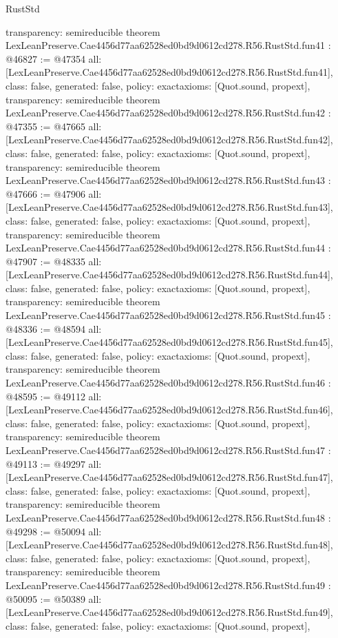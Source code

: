 \begin{lexlean}{RustStd}
\begin{coremodule}
{  transparency: semireducible
}
theorem LexLeanPreserve.Cae4456d77aa62528ed0bd9d0612cd278.R56.RustStd.fun41 : @46827 := @47354 {
  all: [LexLeanPreserve.Cae4456d77aa62528ed0bd9d0612cd278.R56.RustStd.fun41],
  class: false,
  generated: false,
  policy: exact{axioms: [Quot.sound, propext]},
  transparency: semireducible
}
theorem LexLeanPreserve.Cae4456d77aa62528ed0bd9d0612cd278.R56.RustStd.fun42 : @47355 := @47665 {
  all: [LexLeanPreserve.Cae4456d77aa62528ed0bd9d0612cd278.R56.RustStd.fun42],
  class: false,
  generated: false,
  policy: exact{axioms: [Quot.sound, propext]},
  transparency: semireducible
}
theorem LexLeanPreserve.Cae4456d77aa62528ed0bd9d0612cd278.R56.RustStd.fun43 : @47666 := @47906 {
  all: [LexLeanPreserve.Cae4456d77aa62528ed0bd9d0612cd278.R56.RustStd.fun43],
  class: false,
  generated: false,
  policy: exact{axioms: [Quot.sound, propext]},
  transparency: semireducible
}
theorem LexLeanPreserve.Cae4456d77aa62528ed0bd9d0612cd278.R56.RustStd.fun44 : @47907 := @48335 {
  all: [LexLeanPreserve.Cae4456d77aa62528ed0bd9d0612cd278.R56.RustStd.fun44],
  class: false,
  generated: false,
  policy: exact{axioms: [Quot.sound, propext]},
  transparency: semireducible
}
theorem LexLeanPreserve.Cae4456d77aa62528ed0bd9d0612cd278.R56.RustStd.fun45 : @48336 := @48594 {
  all: [LexLeanPreserve.Cae4456d77aa62528ed0bd9d0612cd278.R56.RustStd.fun45],
  class: false,
  generated: false,
  policy: exact{axioms: [Quot.sound, propext]},
  transparency: semireducible
}
theorem LexLeanPreserve.Cae4456d77aa62528ed0bd9d0612cd278.R56.RustStd.fun46 : @48595 := @49112 {
  all: [LexLeanPreserve.Cae4456d77aa62528ed0bd9d0612cd278.R56.RustStd.fun46],
  class: false,
  generated: false,
  policy: exact{axioms: [Quot.sound, propext]},
  transparency: semireducible
}
theorem LexLeanPreserve.Cae4456d77aa62528ed0bd9d0612cd278.R56.RustStd.fun47 : @49113 := @49297 {
  all: [LexLeanPreserve.Cae4456d77aa62528ed0bd9d0612cd278.R56.RustStd.fun47],
  class: false,
  generated: false,
  policy: exact{axioms: [Quot.sound, propext]},
  transparency: semireducible
}
theorem LexLeanPreserve.Cae4456d77aa62528ed0bd9d0612cd278.R56.RustStd.fun48 : @49298 := @50094 {
  all: [LexLeanPreserve.Cae4456d77aa62528ed0bd9d0612cd278.R56.RustStd.fun48],
  class: false,
  generated: false,
  policy: exact{axioms: [Quot.sound, propext]},
  transparency: semireducible
}
theorem LexLeanPreserve.Cae4456d77aa62528ed0bd9d0612cd278.R56.RustStd.fun49 : @50095 := @50389 {
  all: [LexLeanPreserve.Cae4456d77aa62528ed0bd9d0612cd278.R56.RustStd.fun49],
  class: false,
  generated: false,
  policy: exact{axioms: [Quot.sound, propext]},
}
\end{coremodule}
\end{lexlean}
